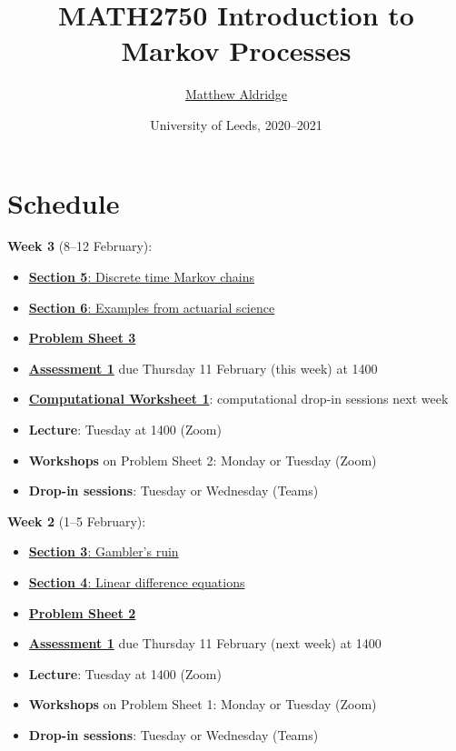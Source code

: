 \documentclass[
  a4paper,
]{article}
\title{MATH2750 Introduction to Markov Processes}
\author{\href{mailto:m.aldridge@leeds.ac.uk}{Matthew Aldridge}}
\date{University of Leeds, 2020--2021}
\providecommand{\tightlist}{%
  \setlength{\itemsep}{0pt}\setlength{\parskip}{0pt}}
\theoremstyle{definition}
\theoremstyle{definition}
\theoremstyle{definition}
\theoremstyle{remark}
\begin{document}
\maketitle

{
\setcounter{tocdepth}{2}
\tableofcontents
}
\hypertarget{home}{%
\section*{Schedule}\label{home}}

\textbf{Week 3} (8--12 February):

\begin{itemize}
\tightlist
\item
  \protect\hyperlink{S05-markov-chains}{\textbf{Section 5}: Discrete time Markov chains}
\item
  \protect\hyperlink{S06-examples}{\textbf{Section 6}: Examples from actuarial science}
\item
  \protect\hyperlink{P03}{\textbf{Problem Sheet 3}}
\item
  \protect\hyperlink{A1}{\textbf{Assessment 1}} due Thursday 11 February (this week) at 1400
\item
  \protect\hyperlink{computing}{\textbf{Computational Worksheet 1}}: computational drop-in sessions next week
\item
  \textbf{Lecture}: Tuesday at 1400 (Zoom)
\item
  \textbf{Workshops} on Problem Sheet 2: Monday or Tuesday (Zoom)
\item
  \textbf{Drop-in sessions}: Tuesday or Wednesday (Teams)
\end{itemize}

\textbf{Week 2} (1--5 February):

\begin{itemize}
\tightlist
\item
  \protect\hyperlink{S03-gamblers-ruin}{\textbf{Section 3}: Gambler's ruin}
\item
  \protect\hyperlink{S04-ldes}{\textbf{Section 4}: Linear difference equations}
\item
  \protect\hyperlink{P02}{\textbf{Problem Sheet 2}}
\item
  \protect\hyperlink{A1}{\textbf{Assessment 1}} due Thursday 11 February (next week) at 1400
\item
  \textbf{Lecture}: Tuesday at 1400 (Zoom)
\item
  \textbf{Workshops} on Problem Sheet 1: Monday or Tuesday (Zoom)
\item
  \textbf{Drop-in sessions}: Tuesday or Wednesday (Teams)
\end{itemize}
\end{document}
